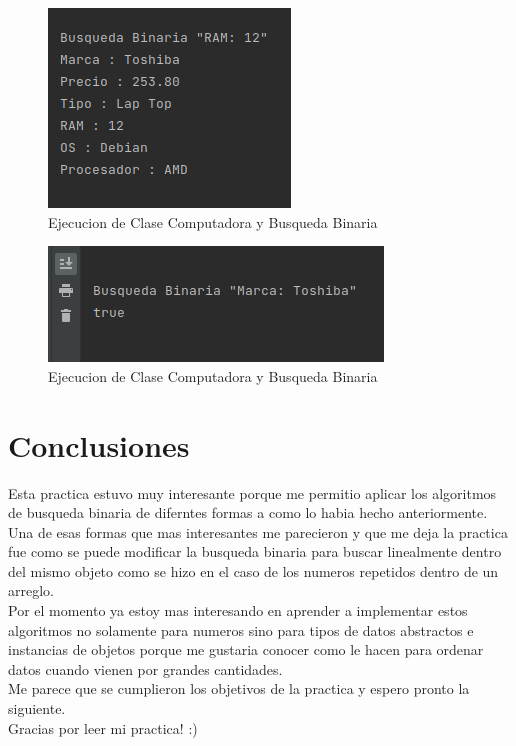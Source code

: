 \documentclass{article}
\begin{document}
				\begin{figure}[H]
					\centering
					\includegraphics[scale = 0.8]{images/e43.png}
					\caption{Ejecucion de Clase Computadora y Busqueda Binaria}
				\end{figure}
			
				\begin{figure}[H]
					\centering
					\includegraphics[scale = 0.8]{images/e44.png}
					\caption{Ejecucion de Clase Computadora y Busqueda Binaria}
				\end{figure}
			
			\newpage
	
	\section{Conclusiones}
	
	Esta practica estuvo muy interesante porque me permitio aplicar los algoritmos de busqueda binaria de diferntes formas a como lo habia hecho anteriormente.\\
	
	Una de esas formas que mas interesantes me parecieron y que me deja la practica  fue como se puede modificar la busqueda binaria para buscar linealmente dentro del mismo objeto como se hizo en el caso de los numeros repetidos dentro de un arreglo.\\
	
	Por el momento ya estoy mas interesando en aprender a implementar estos algoritmos no solamente para numeros sino para tipos de datos abstractos e instancias de objetos porque me gustaria conocer como le hacen para ordenar datos cuando vienen por grandes cantidades.\\
	
	Me parece que se cumplieron los objetivos de la practica y espero pronto la siguiente.\\
	
	Gracias por leer mi practica! :)
	
	
	
	 
	
\end{document}
